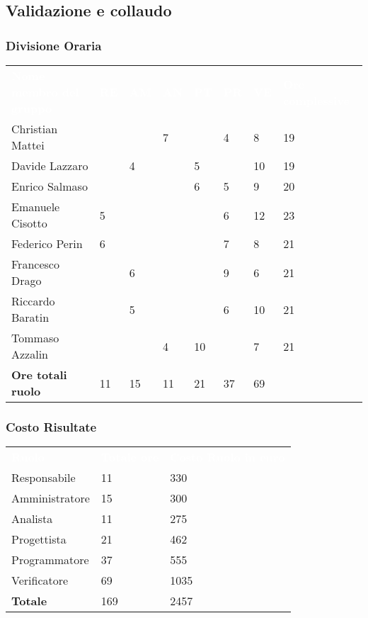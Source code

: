 \subsection{Validazione e collaudo}

\subsubsection{Divisione Oraria}
{
	\renewcommand{\arraystretch}{2}
	\centering
	\begin{longtable}{ C{5cm} C{1cm} C{1cm} C{1cm} C{1cm} C{1cm} C{1cm} C{3cm}}
		\textcolor{white}{\textbf{Nome membro del gruppo}} & \textcolor{white}{\textbf{RE}} & \textcolor{white}{\textbf{AM}} & \textcolor{white}{\textbf{AN}} & \textcolor{white}{\textbf{PT}} & \textcolor{white}{\textbf{PR}} & \textcolor{white}{\textbf{VE}} & \textcolor{white}{\textbf{Ore complessive}}\\	
        
        Christian Mattei & & & 7 & & 4 & 8 & 19\\
        Davide Lazzaro & & 4 & & 5 & & 10 & 19\\
        Enrico Salmaso & & & & 6 & 5 & 9 & 20\\
        Emanuele Cisotto & 5 & & & & 6 & 12 & 23 \\
        Federico Perin & 6 & & & & 7 & 8 & 21\\
        Francesco Drago & & 6 & & & 9 & 6 & 21\\
        Riccardo Baratin & & 5 & & & 6 & 10 & 21\\
        Tommaso Azzalin & & & 4 & 10 & & 7 & 21\\
        \textbf{Ore totali ruolo} & 11 & 15 & 11 & 21 & 37 & 69 & \\
		
	\end{longtable}
}

\subsubsection{Costo Risultate}
{
	\renewcommand{\arraystretch}{2}
	\centering
	\begin{longtable}{ C{3cm} C{2cm} C{4cm}}
		\textcolor{white}{\textbf{Ruolo}} & \textcolor{white}{\textbf{Totale ore}} & \textcolor{white}{\textbf{Costo Ruolo in euro}}\\	
        
        Responsabile & 11 & 330\\
        Amministratore & 15 & 300 \\
        Analista & 11 & 275\\
        Progettista & 21 & 462\\
        Programmatore & 37 & 555\\
        Verificatore & 69 & 1035\\
        \textbf{Totale} & 169 & 2457\\
		
	\end{longtable}
}

